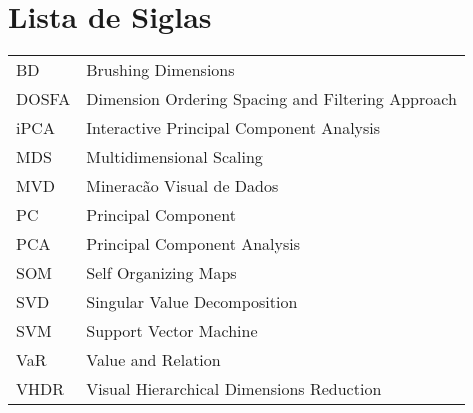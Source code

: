 \chapter*{Lista de Siglas}

\begin{tabular}{l l}
    BD & Brushing Dimensions\\
    DOSFA & Dimension Ordering Spacing and Filtering
    Approach\\
    iPCA & Interactive Principal Component Analysis\\
    MDS  & Multidimensional Scaling\\
    MVD & Mineracão Visual de Dados\\
    PC & Principal Component\\
    PCA & Principal Component Analysis\\
    SOM & Self Organizing Maps\\
    SVD  & Singular Value Decomposition\\
    SVM & Support Vector Machine\\
    VaR & Value and Relation\\
    VHDR & Visual Hierarchical Dimensions Reduction\\
\end{tabular}
